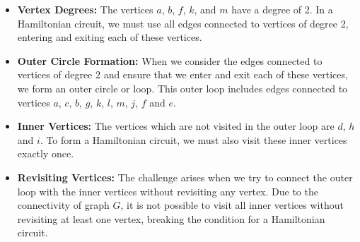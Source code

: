 \documentclass[12pt]{article}
\begin{document}
\begin{itemize}
    \item \textbf{Vertex Degrees:} The vertices \( a \), \( b \), \( f \), \( k \), and \( m \) have a degree of 2. In a Hamiltonian circuit, we must use all edges connected to vertices of degree 2, entering and exiting each of these vertices.
    
    \item \textbf{Outer Circle Formation:} When we consider the edges connected to vertices of degree 2 and ensure that we enter and exit each of these vertices, we form an outer circle or loop. This outer loop includes edges connected to vertices \( a \), \( c \), \( b \), \( g \), \( k \), \( l \), \( m \), \( j \), \( f \) and \( e \).
    

    \item \textbf{Inner Vertices:} The vertices which are not visited in the outer loop are \( d \), \( h \) and \( i \). To form a Hamiltonian circuit, we must also visit these inner vertices exactly once.
    
    \item \textbf{Revisiting Vertices:} The challenge arises when we try to connect the outer loop with the inner vertices without revisiting any vertex. Due to the connectivity of graph \( G \), it is not possible to visit all inner vertices without revisiting at least one vertex, breaking the condition for a Hamiltonian circuit.
\end{itemize}
\end{document}
